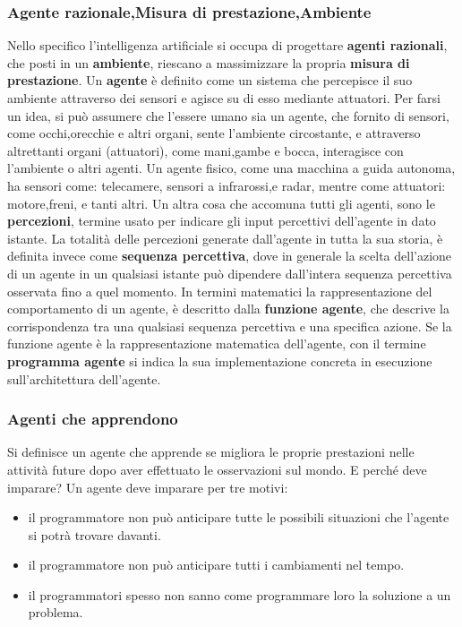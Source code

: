 \documentclass[14pt]{extarticle}
\begin{document}
\subsubsection{Agente razionale,Misura di prestazione,Ambiente}
Nello specifico l'intelligenza artificiale si occupa di progettare \textbf{agenti razionali}, che posti in un \textbf{ambiente}, riescano a massimizzare la propria \textbf{misura di prestazione}.\cite{russell2005intelligenza}
Un \textbf{agente} è definito  come un sistema che percepisce il suo ambiente attraverso dei sensori e agisce su di esso mediante attuatori. Per farsi un idea, si può assumere che l'essere umano sia un agente, che fornito di sensori, come occhi,orecchie e altri organi, sente l'ambiente circostante, e attraverso altrettanti organi (attuatori), come mani,gambe e bocca, interagisce con l'ambiente o altri agenti.
Un agente fisico, come una macchina a guida autonoma, ha sensori come: telecamere, sensori a infrarossi,e radar, mentre come attuatori: motore,freni, e tanti altri. 
Un altra cosa che accomuna tutti gli agenti, sono le  \textbf{percezioni}, termine usato per indicare gli input percettivi dell'agente in dato istante.\cite{russell2005intelligenza}
La totalità delle percezioni generate dall'agente in tutta la sua storia, è definita invece come \textbf{sequenza percettiva}, dove in generale la scelta dell'azione di un agente in un qualsiasi istante può dipendere dall'intera sequenza percettiva osservata fino a quel momento.
In termini matematici la rappresentazione del comportamento di un agente, è descritto dalla \textbf{funzione agente}, che descrive la corrispondenza tra una qualsiasi sequenza percettiva e una specifica azione.
Se la funzione agente è la rappresentazione matematica dell'agente, con il termine \textbf{programma agente} si indica la sua implementazione concreta  in  esecuzione sull'architettura dell'agente.  \cite{russell2005intelligenza}

\subsubsection{Agenti che apprendono}
Si definisce un agente che apprende se migliora le proprie prestazioni nelle attività future dopo aver effettuato le osservazioni
sul mondo. \cite{russell2005intelligenza}
E perché deve imparare?
Un agente deve imparare per tre motivi:
\begin{itemize}
\item  il programmatore non può anticipare tutte le possibili situazioni che l'agente si potrà trovare davanti.
\item il programmatore non può anticipare tutti i cambiamenti nel tempo.
\item il programmatori spesso non sanno come programmare loro la soluzione a un problema.
\end{itemize}\cite{russell2005intelligenza}
\end{document}
